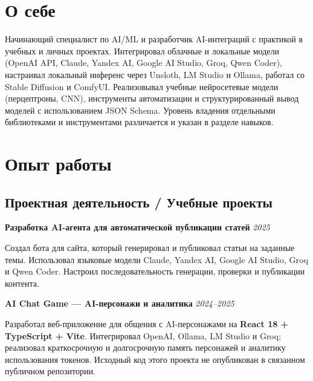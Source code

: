 \documentclass[10pt,a4paper]{article}
\newcommand{\projectEntry}[3]{\textbf{#1} \hfill \textit{#2}\par #3\par\vspace{0.3em}}
\begin{document}

\section{О себе}

Начинающий специалист по AI/ML и разработчик AI-интеграций с практикой в учебных и личных проектах. Интегрировал облачные и локальные модели (OpenAI API, Claude, Yandex AI, Google AI Studio, Groq, Qwen Coder), настраивал локальный инференс через Unsloth, LM Studio и Ollama, работал со Stable Diffusion и ComfyUI. Реализовывал учебные нейросетевые модели (перцептроны, CNN), инструменты автоматизации и структурированный вывод моделей с использованием JSON Schema. Уровень владения отдельными библиотеками и инструментами различается и указан в разделе навыков.

\section{Опыт работы}

\subsection{Проектная деятельность / Учебные проекты}

\projectEntry{Разработка AI-агента для автоматической публикации статей}{2025}
{Создал бота для сайта, который генерировал и публиковал статьи на заданные темы. Использовал языковые модели Claude, Yandex AI, Google AI Studio, Groq и Qwen Coder. Настроил последовательность генерации, проверки и публикации контента.}

\projectEntry{AI Chat Game --- AI-персонажи и аналитика}{2024--2025}
{Разработал веб-приложение для общения с AI-персонажами на \textbf{React 18 + TypeScript + Vite}. Интегрировал OpenAI, Ollama, LM Studio и Groq; реализовал краткосрочную и долгосрочную память персонажей и аналитику использования токенов. Исходный код этого проекта не опубликован в связанном публичном репозитории.}
\end{document}
